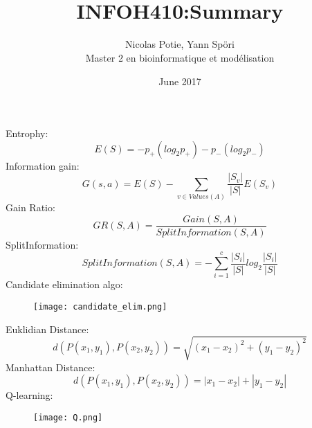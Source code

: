 \documentclass{article}
\author{Nicolas Potie, Yann Sp\"ori\\ Master 2 en bioinformatique et modélisation}
\title{\\INFOH410:Summary}
\date{June 2017}
\makeatletter
\def\maketitle{%
  \null
  \thispagestyle{empty}%
  \vfill
  \begin{center}\leavevmode
    \normalfont
    \texttt{[image: ./ulb.jpg]}
    {\LARGE \@title\par}%
    \vskip 0.5cm
    {\Large \@author\par}%
    \vskip 0.5cm
    {\Large \@date\par}%
  \end{center}%
  \vfill
  \null
  \newpage
  }
\makeatother
\begin{document}
\pagebreak

Entrophy:\\
\[
E(S)=-p_{+}(log_2{p_{+}})-p_{-}(log_2{p_{-}})
\]
Information gain:\\
\[
G(s,a) = E(S)-\sum_{v \in Values(A)} \frac{|S_v|}{|S|}E(S_v)
\]
Gain Ratio:
\[
GR(S,A) = \frac{Gain(S,A)}{SplitInformation(S,A)}
\]
SplitInformation:
\[
SplitInformation(S,A) = - \sum_{i=1}^{c} \frac{|S_i|}{|S|} log_2 \frac{|S_i|}{|S|}
\]
Candidate elimination algo:
\begin{figure}[H]
\texttt{[image: candidate\_elim.png]}
\end{figure}
Euklidian Distance:\\
\[
d(P(x_1, y_1), P(x_2, y_2)) = \sqrt{(x_1-x_2)^2 + (y_1-y_2)^2}
\]
Manhattan Distance:\\
\[
d(P(x_1, y_1), P(x_2, y_2)) = |x_1-x_2| + |y_1-y_2|
\]
Q-learning:
\begin{figure}[H]
\texttt{[image: Q.png]}
\end{figure}
\end{document}
